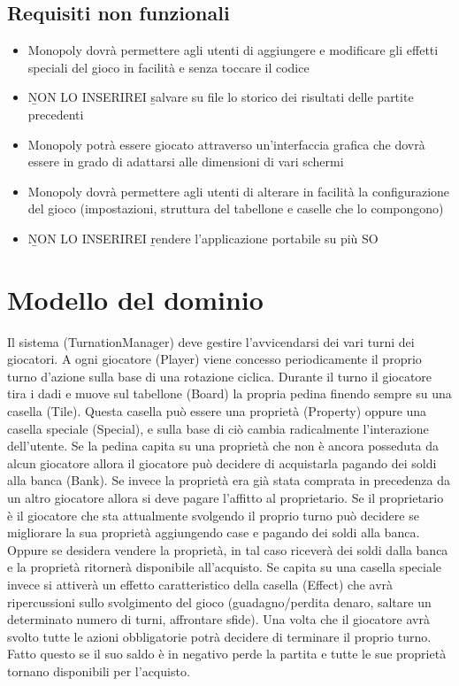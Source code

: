 \subsection*{Requisiti non funzionali}
\begin{itemize}
    \item 
    Monopoly dovrà permettere agli utenti di aggiungere e 
    modificare gli effetti speciali del gioco in facilità e senza toccare il codice
    \item \b NON LO INSERIREI \b salvare su file lo storico dei risultati delle partite precedenti
    \item Monopoly potrà essere giocato attraverso un'interfaccia grafica
    che dovrà essere in grado di adattarsi alle dimensioni di vari schermi
    \item 
    Monopoly dovrà permettere agli utenti di alterare in facilità la 
    configurazione del gioco (impostazioni, struttura del tabellone e caselle che lo compongono)
    \item \b NON LO INSERIREI \b rendere l’applicazione portabile su più SO
\end{itemize}

\section{Modello del dominio}
Il sistema (TurnationManager) deve gestire l’avvicendarsi dei vari turni dei giocatori. 
A ogni giocatore (Player) viene concesso periodicamente il proprio turno d’azione sulla base di una rotazione ciclica. 
Durante il turno il giocatore tira i dadi e muove sul tabellone (Board) la propria pedina finendo sempre su una casella (Tile).
Questa casella può essere una proprietà (Property) oppure una casella speciale (Special), 
e sulla base di ciò cambia radicalmente l’interazione dell’utente. 
Se la pedina capita su una proprietà che non è ancora posseduta da alcun giocatore allora 
il giocatore può decidere di acquistarla pagando dei soldi alla banca (Bank). 
Se invece la proprietà era già stata comprata in precedenza da un altro giocatore allora si 
deve pagare l'affitto al proprietario. 
Se il proprietario è il giocatore che sta attualmente svolgendo il proprio turno 
può decidere se migliorare la sua proprietà aggiungendo case e pagando dei soldi alla banca. 
Oppure se desidera vendere la proprietà, in tal caso riceverà dei soldi dalla banca e la proprietà ritornerà
disponibile all'acquisto.
Se capita su una casella speciale invece si attiverà un effetto caratteristico della casella (Effect)
che avrà ripercussioni sullo svolgimento del gioco 
(guadagno/perdita denaro, saltare un determinato numero di turni, affrontare sfide).
Una volta che il giocatore avrà svolto tutte le azioni obbligatorie potrà decidere di terminare il proprio turno. 
Fatto questo se il suo saldo è in negativo perde la partita e tutte le sue proprietà tornano disponibili per l’acquisto. 




